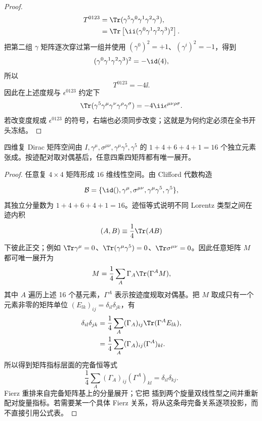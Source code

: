 \begin{proof}
\begin{align*}
 T^{0123}
 &=\Tr(\gamma^5\gamma^0\gamma^1\gamma^2\gamma^3),\\
 &=\Tr\left[
 \ii(\gamma^0\gamma^1\gamma^2\gamma^3)^2
 \right].
\end{align*}
把第二组 $\gamma$ 矩阵逐次穿过第一组并使用
$(\gamma^0)^2=+1$、$(\gamma^i)^2=-1$，得到
\begin{equation*}
 (\gamma^0\gamma^1\gamma^2\gamma^3)^2=-\id(4),
\end{equation*}
所以
\begin{equation*}
 T^{0123}=-4\ii.
\end{equation*}
因此在上述度规与 $\epsilon^{0123}$ 约定下
\begin{equation*}
 {
 \Tr(\gamma^5\gamma^\mu\gamma^\nu\gamma^\rho\gamma^\sigma)
 =-4\ii\epsilon^{\mu\nu\rho\sigma}.}
 \end{equation*}
若改变度规或 $\epsilon^{0123}$ 的符号，右端也必须同步改变；这就是为何约定必须在全书开头冻结。
\end{proof}

\begin{proposition}
四维复 Dirac 矩阵空间由 $I,\gamma^\mu,\sigma^{\mu\nu},\gamma^\mu\gamma^5,\gamma^5$ 的 $1+4+6+4+1=16$ 个独立元素张成。按迹配对取对偶基后，任意四乘四矩阵都有唯一展开。
\end{proposition}
\begin{proof}
任意复 $4\times4$ 矩阵形成 $16$ 维线性空间。由 Clifford 代数构造

\begin{equation*}
 \mathcal B=
 \{\id(),\gamma^\mu,\sigma^{\mu\nu},\gamma^\mu\gamma^5,\gamma^5\},
 \end{equation*}
其独立分量数为
$1+4+6+4+1=16$。迹恒等式说明不同 Lorentz 类型之间在迹内积
\begin{equation*}
 (A,B)\equiv\frac14\Tr(AB)
\end{equation*}
下彼此正交；例如 $\Tr\gamma^\mu=0$、$\Tr(\gamma^\mu\gamma^5)=0$、$\Tr\sigma^{\mu\nu}=0$。因此任意矩阵 $M$ 都可唯一展开为
\begin{equation*}
 M=\frac14\sum_A \Gamma_A\Tr(\Gamma^A M),
 \end{equation*}
其中 $A$ 遍历上述 16 个基元素，$\Gamma^A$ 表示按迹度规取对偶基。把 $M$ 取成只有一个元素非零的矩阵单位 $(E_{lk})_{ij}=\delta_{il}\delta_{jk}$，有
\begin{align*}
 \delta_{il}\delta_{jk}
 &=\frac14\sum_A(\Gamma_A)_{ij}
 \Tr(\Gamma^A E_{lk}),\\
 &=\frac14\sum_A(\Gamma_A)_{ij}(\Gamma^A)_{kl}.
\end{align*}
所以得到矩阵指标层面的完备恒等式
\begin{equation*}
 {
 \frac14\sum_A
 (\Gamma_A)_{ij}(\Gamma^A)_{kl}
 =\delta_{il}\delta_{kj}.}
 \end{equation*}
Fierz 重排来自完备矩阵基上的分量展开；它把
插到两个旋量双线性型之间并重新配对旋量指标。若需要某一个具体 Fierz 关系，将从这条母完备关系逐项投影，而不直接引用公式表。
\end{proof}

